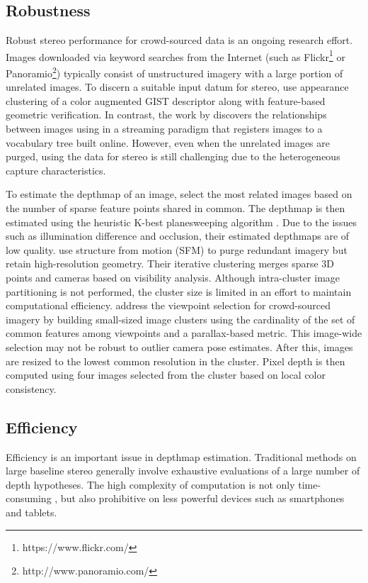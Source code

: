 \subsection{Robustness}
Robust stereo performance for crowd-sourced data is an ongoing research effort.
Images downloaded via keyword searches from the Internet (such as Flickr\footnote{https://www.flickr.com/} or Panoramio\footnote{http://www.panoramio.com/}) typically consist of unstructured imagery with a large portion of unrelated images. To discern a suitable input datum for stereo, \citet{Frahm2010} use appearance clustering of a color augmented GIST descriptor \cite{oliva2001modeling} along with feature-based geometric verification. In contrast, the work by \citet{Heinly} discovers the relationships between images using in a streaming paradigm that registers images to a vocabulary tree built online. However, even when the unrelated images are purged, using the data for stereo is still challenging due to the heterogeneous capture characteristics.

To estimate the depthmap of an image, \citet{Frahm2010} select the most related images based on the number of sparse feature points shared in common. The depthmap is then estimated using the heuristic K-best planesweeping algorithm  \cite{handle_occlusion2001}. Due to the issues such as illumination difference and occlusion, their estimated depthmaps are of low quality. 
\citet{InternetScaleMVS_CVPR2010} use structure from motion (SFM) to purge redundant imagery but retain high-resolution geometry. Their iterative clustering merges sparse 3D points and cameras based on visibility analysis. Although intra-cluster image partitioning is not performed, the cluster size is limited in an effort to maintain computational efficiency. \citet{Goesele07} address the viewpoint selection for crowd-sourced imagery by building small-sized image clusters using the cardinality of the set of common features among viewpoints and a parallax-based metric. This image-wide selection may not be robust to outlier camera pose estimates. After this, images are resized to the lowest common resolution in the cluster. Pixel depth is then computed using four images selected from the cluster based on local color consistency.

\subsection{Efficiency}
Efficiency is an important issue in depthmap estimation. Traditional methods on large baseline stereo generally involve exhaustive evaluations of a large number of depth hypotheses. The high complexity of computation is not only time-consuming \cite{yang2003multi,CombinedDepthOutlier,Gallup07,LeastCommitment_3DIMPVT2012}, but also prohibitive on  less powerful devices such as smartphones and tablets. 

